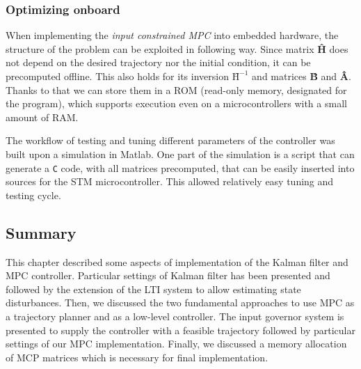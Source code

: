 \subsubsection{Optimizing onboard}

When implementing the \emph{input constrained MPC} into embedded hardware, the structure of the problem can be exploited in following way. Since matrix \textbf{\^H} does not depend on the desired trajectory nor the initial condition, it can be precomputed offline. This also holds for its inversion $\textbf{\^H}^{-1}$ and matrices \textbf{\^B} and \textbf{\^A}. Thanks to that we can store them in a ROM (read-only memory, designated for the program), which supports execution even on a microcontrollers with a small amount of RAM.

The workflow of testing and tuning different parameters of the controller was built upon a simulation in Matlab. One part of the simulation is a script that can generate a \verb!C! code, with all matrices precomputed, that can be easily inserted into sources for the STM microcontroller. This allowed relatively easy tuning and testing cycle.

\subsection{Summary}

This chapter described some aspects of implementation of the Kalman filter and MPC controller. Particular settings of Kalman filter has been presented and followed by the extension of the LTI system to allow estimating state disturbances. Then, we discussed the two fundamental approaches to use MPC as a trajectory planner and as a low-level controller. The input governor system is presented to supply the controller with a feasible trajectory followed by particular settings of our MPC implementation. Finally, we discussed a memory allocation of MCP matrices which is necessary for final implementation.